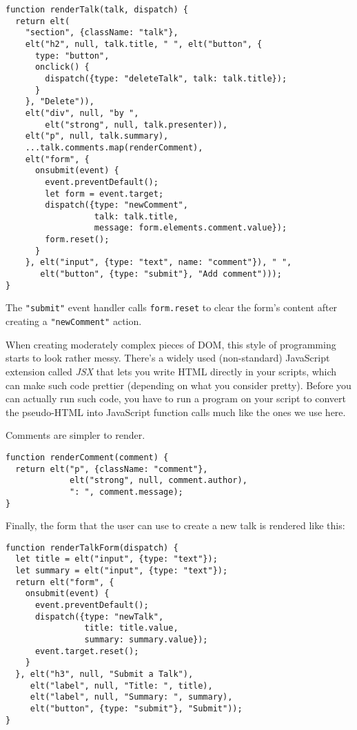 \begin{lstlisting}
function renderTalk(talk, dispatch) {
  return elt(
    "section", {className: "talk"},
    elt("h2", null, talk.title, " ", elt("button", {
      type: "button",
      onclick() {
        dispatch({type: "deleteTalk", talk: talk.title});
      }
    }, "Delete")),
    elt("div", null, "by ",
        elt("strong", null, talk.presenter)),
    elt("p", null, talk.summary),
    ...talk.comments.map(renderComment),
    elt("form", {
      onsubmit(event) {
        event.preventDefault();
        let form = event.target;
        dispatch({type: "newComment",
                  talk: talk.title,
                  message: form.elements.comment.value});
        form.reset();
      }
    }, elt("input", {type: "text", name: "comment"}), " ",
       elt("button", {type: "submit"}, "Add comment")));
}
\end{lstlisting}
\noindent{}

The \lstinline`"submit"` event handler calls \lstinline`form.reset` to clear the form's content after creating a \lstinline`"newComment"` action.

When creating moderately complex pieces of DOM, this style of programming starts to look rather messy. There's a widely used (non-standard) JavaScript extension called \emph{JSX} that lets you write HTML directly in your scripts, which can make such code prettier (depending on what you consider pretty). Before you can actually run such code, you have to run a program on your script to convert the pseudo-HTML into JavaScript function calls much like the ones we use here.

Comments are simpler to render.

\begin{lstlisting}
function renderComment(comment) {
  return elt("p", {className: "comment"},
             elt("strong", null, comment.author),
             ": ", comment.message);
}
\end{lstlisting}
\noindent{}

Finally, the form that the user can use to create a new talk is rendered like this:

\begin{lstlisting}
function renderTalkForm(dispatch) {
  let title = elt("input", {type: "text"});
  let summary = elt("input", {type: "text"});
  return elt("form", {
    onsubmit(event) {
      event.preventDefault();
      dispatch({type: "newTalk",
                title: title.value,
                summary: summary.value});
      event.target.reset();
    }
  }, elt("h3", null, "Submit a Talk"),
     elt("label", null, "Title: ", title),
     elt("label", null, "Summary: ", summary),
     elt("button", {type: "submit"}, "Submit"));
}
\end{lstlisting}
\noindent

